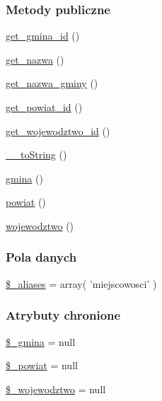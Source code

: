 \subsubsection*{Metody publiczne}
\begin{DoxyCompactItemize}
\item 
\hyperlink{classep___miejscowosc_a63aa148dc21ae1078168b2ea9507ac8b}{get\-\_\-gmina\-\_\-id} ()
\item 
\hyperlink{classep___miejscowosc_ac0818f0049d7b84f08f77128f54cee36}{get\-\_\-nazwa} ()
\item 
\hyperlink{classep___miejscowosc_a85b2f9370c626b7a21dd7f4333260936}{get\-\_\-nazwa\-\_\-gminy} ()
\item 
\hyperlink{classep___miejscowosc_a7c13f20e38e0898d072c067a64cb9065}{get\-\_\-powiat\-\_\-id} ()
\item 
\hyperlink{classep___miejscowosc_a36399d80f5ab76bb2d958a481f9002ff}{get\-\_\-wojewodztwo\-\_\-id} ()
\item 
\hyperlink{classep___miejscowosc_a7516ca30af0db3cdbf9a7739b48ce91d}{\-\_\-\-\_\-to\-String} ()
\item 
\hyperlink{classep___miejscowosc_ae13445f31d6a2e43182ca0e2ce2f821d}{gmina} ()
\item 
\hyperlink{classep___miejscowosc_afeb09b2f0c7a3cd1d9bfe029ffdd57ea}{powiat} ()
\item 
\hyperlink{classep___miejscowosc_a2c735142a4af50d47b17d8103a9ab9ab}{wojewodztwo} ()
\end{DoxyCompactItemize}
\subsubsection*{Pola danych}
\begin{DoxyCompactItemize}
\item 
\hyperlink{classep___miejscowosc_ab4e31d75f0bc5d512456911e5d01366b}{\$\-\_\-aliases} = array( 'miejscowosci' )
\end{DoxyCompactItemize}
\subsubsection*{Atrybuty chronione}
\begin{DoxyCompactItemize}
\item 
\hyperlink{classep___miejscowosc_ab0313b743bc1be610472dfee711e929a}{\$\-\_\-gmina} = null
\item 
\hyperlink{classep___miejscowosc_a928275f8378baade592a64f89da229ef}{\$\-\_\-powiat} = null
\item 
\hyperlink{classep___miejscowosc_a2a0a830e555a9e31b5118be82dbc33c7}{\$\-\_\-wojewodztwo} = null
\end{DoxyCompactItemize}
